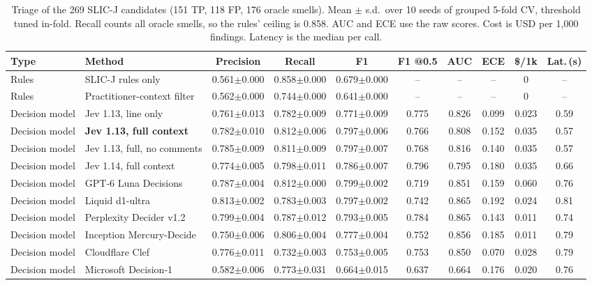 \begin{table}[t]\centering\caption{Triage of the 269 SLIC-J candidates (151 TP, 118 FP, 176 oracle smells). Mean $\pm$ s.d.\ over 10 seeds of grouped 5-fold CV, threshold tuned in-fold. Recall counts all oracle smells, so the rules' ceiling is 0.858. AUC and ECE use the raw scores. Cost is USD per 1{,}000 findings. Latency is the median per call.}\label{tab:rq3}
\scriptsize\setlength{\tabcolsep}{4pt}\begin{tabular}{llcccccccc}\toprule
Type & Method & Precision & Recall & F1 & F1 @0.5 & AUC & ECE & \$/1k & Lat.\,(s) \\ \midrule
Rules & SLIC-J rules only & 0.561$\pm$0.000 & 0.858$\pm$0.000 & 0.679$\pm$0.000 & -- & -- & -- & 0 & -- \\
Rules & Practitioner-context filter & 0.562$\pm$0.000 & 0.744$\pm$0.000 & 0.641$\pm$0.000 & -- & -- & -- & 0 & -- \\
\midrule
Decision model & Jev 1.13, line only & 0.761$\pm$0.013 & 0.782$\pm$0.009 & 0.771$\pm$0.009 & 0.775 & 0.826 & 0.099 & 0.023 & 0.59 \\
Decision model & \textbf{Jev 1.13, full context} & 0.782$\pm$0.010 & 0.812$\pm$0.006 & 0.797$\pm$0.006 & 0.766 & 0.808 & 0.152 & 0.035 & 0.57 \\
Decision model & Jev 1.13, full, no comments & 0.785$\pm$0.009 & 0.811$\pm$0.009 & 0.797$\pm$0.007 & 0.768 & 0.816 & 0.140 & 0.035 & 0.57 \\
Decision model & Jev 1.14, full context & 0.774$\pm$0.005 & 0.798$\pm$0.011 & 0.786$\pm$0.007 & 0.796 & 0.795 & 0.180 & 0.035 & 0.66 \\
Decision model & GPT-6 Luna Decisions & 0.787$\pm$0.004 & 0.812$\pm$0.000 & 0.799$\pm$0.002 & 0.719 & 0.851 & 0.159 & 0.060 & 0.76 \\
Decision model & Liquid d1-ultra & 0.813$\pm$0.002 & 0.783$\pm$0.003 & 0.797$\pm$0.002 & 0.742 & 0.865 & 0.192 & 0.024 & 0.81 \\
Decision model & Perplexity Decider v1.2 & 0.799$\pm$0.004 & 0.787$\pm$0.012 & 0.793$\pm$0.005 & 0.784 & 0.865 & 0.143 & 0.011 & 0.74 \\
Decision model & Inception Mercury-Decide & 0.750$\pm$0.006 & 0.806$\pm$0.004 & 0.777$\pm$0.004 & 0.752 & 0.856 & 0.185 & 0.011 & 0.79 \\
Decision model & Cloudflare Clef & 0.776$\pm$0.011 & 0.732$\pm$0.003 & 0.753$\pm$0.005 & 0.753 & 0.850 & 0.070 & 0.028 & 0.79 \\
Decision model & Microsoft Decision-1 & 0.582$\pm$0.006 & 0.773$\pm$0.031 & 0.664$\pm$0.015 & 0.637 & 0.664 & 0.176 & 0.020 & 0.76 \\

\end{tabular}
\end{table}

